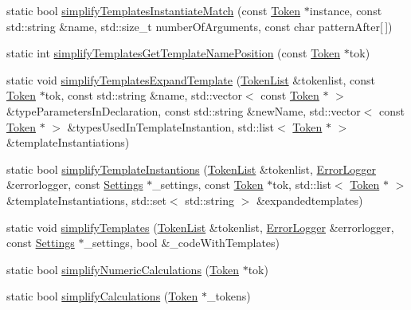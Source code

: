 \begin{DoxyCompactItemize}
\item 
static bool \hyperlink{class_template_simplifier_ab78546bb740ae3f70033101b18a644f4}{simplify\-Templates\-Instantiate\-Match} (const \hyperlink{class_token}{Token} $\ast$instance, const std\-::string \&name, std\-::size\-\_\-t number\-Of\-Arguments, const char pattern\-After\mbox{[}$\,$\mbox{]})
\item 
static int \hyperlink{class_template_simplifier_a2a14b0493991419bfae61168faafd026}{simplify\-Templates\-Get\-Template\-Name\-Position} (const \hyperlink{class_token}{Token} $\ast$tok)
\item 
static void \hyperlink{class_template_simplifier_adb9d597074e9a92aae9c2efa04b786c6}{simplify\-Templates\-Expand\-Template} (\hyperlink{class_token_list}{Token\-List} \&tokenlist, const \hyperlink{class_token}{Token} $\ast$tok, const std\-::string \&name, std\-::vector$<$ const \hyperlink{class_token}{Token} $\ast$ $>$ \&type\-Parameters\-In\-Declaration, const std\-::string \&new\-Name, std\-::vector$<$ const \hyperlink{class_token}{Token} $\ast$ $>$ \&types\-Used\-In\-Template\-Instantion, std\-::list$<$ \hyperlink{class_token}{Token} $\ast$ $>$ \&template\-Instantiations)
\item 
static bool \hyperlink{class_template_simplifier_a1635ce9ca865ed3644315e27a4a8382a}{simplify\-Template\-Instantions} (\hyperlink{class_token_list}{Token\-List} \&tokenlist, \hyperlink{class_error_logger}{Error\-Logger} \&errorlogger, const \hyperlink{class_settings}{Settings} $\ast$\-\_\-settings, const \hyperlink{class_token}{Token} $\ast$tok, std\-::list$<$ \hyperlink{class_token}{Token} $\ast$ $>$ \&template\-Instantiations, std\-::set$<$ std\-::string $>$ \&expandedtemplates)
\item 
static void \hyperlink{class_template_simplifier_a87a4d1913f2c36ec3bde476b6f583226}{simplify\-Templates} (\hyperlink{class_token_list}{Token\-List} \&tokenlist, \hyperlink{class_error_logger}{Error\-Logger} \&errorlogger, const \hyperlink{class_settings}{Settings} $\ast$\-\_\-settings, bool \&\-\_\-code\-With\-Templates)
\item 
static bool \hyperlink{class_template_simplifier_a51e814c75f3940a0e11ba762b11db811}{simplify\-Numeric\-Calculations} (\hyperlink{class_token}{Token} $\ast$tok)
\item 
static bool \hyperlink{class_template_simplifier_a2a4841cbea2e1446b8e4bc5a99dc1f4f}{simplify\-Calculations} (\hyperlink{class_token}{Token} $\ast$\-\_\-tokens)
\end{DoxyCompactItemize}


